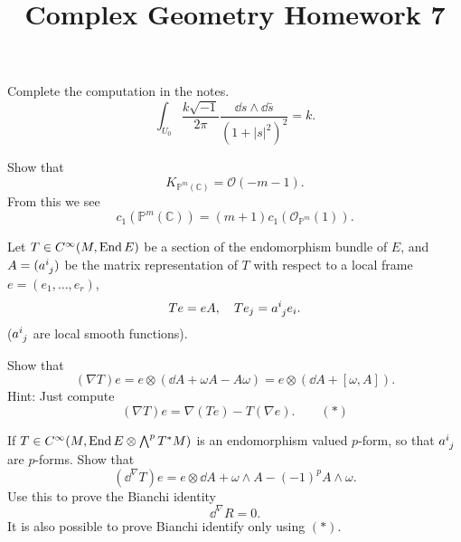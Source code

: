 \documentclass[12pt]{article}
\title{Complex Geometry Homework 7}
\author{}
\date{}
\begin{document}
\maketitle
\begin{problem}
  Complete the computation in the notes. \[
    \int_{U_0}\frac{k\sqrt{-1}}{2\pi}\frac{\dd{s}\wedge \dd{\bar{s}}}{(1+|s|^2)^2}=k
  .\] 
\end{problem}
\begin{problem}
  Show that \[
    K_{\mathbb{P}^m(\mathbb{C})}=\mathcal{O}(-m-1)
  .\] From this we see \[
    c_1(\mathbb{P}^m(\mathbb{C}))=(m+1)c_1(\mathcal{O}_{\mathbb{P}^m}(1))
  .\] 
\end{problem}
\begin{problem}
  Let \(T\in C^\infty(M,\operatorname{End}E)\) be a section of the endomorphism bundle of \(E\),
  and \(A=(a\indices{^i_j})\) be the matrix representation of \(T\) with respect to a
  local frame \(e=(e_1,\ldots,e_r)\), \ie\ \[
    Te=eA,\quad Te_j=a\indices{^i_j}e_i
  .\] (\(a\indices{^i_j}\) are local smooth functions).

  Show that \[
    (\nabla T)e=e\otimes (\dd{A}+\omega A-A\omega)=e\otimes (\dd{A}+[\omega,A])
  .\] Hint: Just compute \[
    (\nabla T)e=\nabla (Te)-T(\nabla e).\qquad (*)
  \] 
\end{problem}
\begin{problem}
  If \(T\in C^\infty(M,\operatorname{End}E\otimes \bigwedge^p T^*M)\) is an endomorphism valued
  \(p\)-form, so that \(a\indices{^i_j}\) are \(p\)-forms. Show that \[
    (\dd^\nabla T)e=e\otimes \dd{A}+\omega\wedge A-(-1)^p A\wedge \omega
  .\] Use this to prove the Bianchi identity \[
    \dd^\nabla R=0
  .\] It is also possible to prove Bianchi identify only using \((*)\).
\end{problem}
\end{document}
